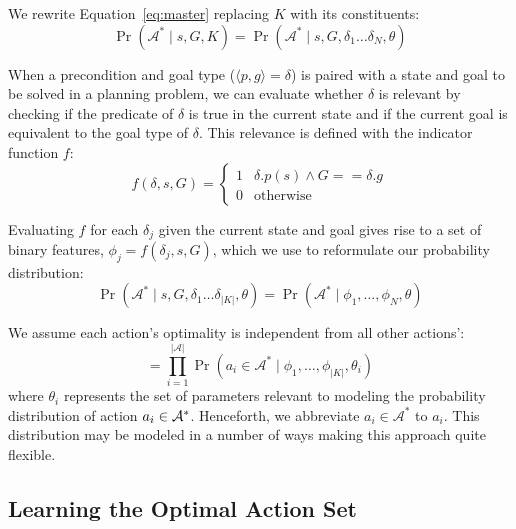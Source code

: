 \documentclass[letterpaper]{article}
\begin{document}
We rewrite Equation~\ref{eq:master} replacing $K$ with its constituents:
\begin{equation}
\Pr(\mathcal{A}^* \mid s, G, K) = \Pr(\mathcal{A}^* \mid s, G, \delta_1 \ldots \delta_{N}, \theta)
\end{equation}

When a precondition and goal type ($\langle p , g \rangle = \delta$) is paired with a
state and goal to be solved in a planning problem, we can evaluate whether $\delta$
is relevant by checking if the predicate of $\delta$ is true in the current state and if 
the current goal is equivalent to the goal type of $\delta$. This relevance is defined with the indicator function $f$:
\begin{equation}
f(\delta, s, G) = 
\begin{cases}
1& \delta.p(s) \wedge G == \delta.g \\
0& \text{otherwise}
\end{cases}
\label{eq:f_func_def}
\end{equation}

Evaluating $f$ for each $\delta_j$ given the current state and goal gives rise to a set of binary features,
$\phi_j = f(\delta_j, s, G)$, which we use to reformulate our probability distribution:
\begin{equation}
\Pr(\mathcal{A}^* \mid s, G, \delta_1 \ldots \delta_{|K|}, \theta) = \Pr(\mathcal{A}^* \mid \phi_1, \ldots, \phi_{N}, \theta)
\label{eq:feature_rep}
\end{equation}

We assume each action's optimality is independent from all other actions':
\begin{equation}
= \prod_{i=1}^{|\mathcal{A}|} \Pr(a_i \in \mathcal{A}^* \mid \phi_1, \ldots, \phi_{|K|}, \theta_i)
\label{eq:action_independ}
\end{equation}
where $\theta_i$ represents the set of parameters relevant to modeling
the probability distribution of action $a_i \in {\cal
  A}^*$. Henceforth, we abbreviate $a_i \in \mathcal{A}^*$ to $a_i$.
This distribution may be modeled in a number of ways making this
approach quite flexible.

\subsection{Learning the Optimal Action Set}
\end{document}
